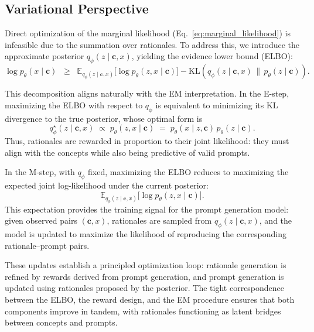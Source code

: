 \subsection{Variational Perspective}
\label{sec:variational}

Direct optimization of the marginal likelihood (Eq.~\ref{eq:marginal_likelihood}) is infeasible due to the summation over rationales. To address this, we introduce the approximate posterior $q_\phi(z \mid \mathbf{c}, x)$, yielding the evidence lower bound (ELBO):
\begin{equation}
\label{eq:elbo}
\log p_\theta(x \mid \mathbf{c}) \;\;\geq\;\; 
\mathbb{E}_{q_\phi(z \mid \mathbf{c}, x)} \big[\log p_\theta(z, x \mid \mathbf{c})\big] 
- \mathrm{KL}\!\left(q_\phi(z \mid \mathbf{c}, x)\,\|\,p_\theta(z \mid \mathbf{c})\right).
\end{equation}

This decomposition aligns naturally with the EM interpretation. In the E-step, maximizing the ELBO with respect to $q_\phi$ is equivalent to minimizing its KL divergence to the true posterior, whose optimal form is
\begin{equation}
\label{eq:posterior}
q_\phi^\star(z \mid \mathbf{c}, x) \;\propto\; p_\theta(z, x \mid \mathbf{c}) \;=\; p_\theta(x \mid z, \mathbf{c})\,p_\theta(z \mid \mathbf{c}).
\end{equation}
Thus, rationales are rewarded in proportion to their joint likelihood: they must align with the concepts while also being predictive of valid prompts.


In the M-step, with $q_\phi$ fixed, maximizing the ELBO reduces to maximizing the expected joint log-likelihood under the current posterior:
\begin{equation}
\label{eq:mstep}
\mathbb{E}_{q_\phi(z \mid \mathbf{c}, x)}\big[\log p_\theta(z, x \mid \mathbf{c})\big].
\end{equation}
This expectation provides the training signal for the prompt generation model: given observed pairs $(\mathbf{c}, x)$, rationales are sampled from $q_\phi(z \mid \mathbf{c}, x)$, and the model is updated to maximize the likelihood of reproducing the corresponding rationale–prompt pairs.

These updates establish a principled optimization loop: rationale generation is refined by rewards derived from prompt generation, and prompt generation is updated using rationales proposed by the posterior. The tight correspondence between the ELBO, the reward design, and the EM procedure ensures that both components improve in tandem, with rationales functioning as latent bridges between concepts and prompts.





